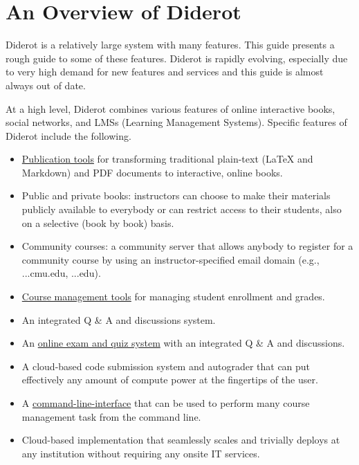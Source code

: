 \chapter{An Overview of Diderot}
\label{ch:overview}

\begin{gram}
Diderot is a relatively large system with many features. This guide presents a rough guide to some of these features.  Diderot is rapidly evolving, especially due to very high demand for new features and services and this guide is almost always out of date.

At a high level, Diderot combines various features of online interactive books,  social networks, and LMSs (Learning Management Systems).
% 
Specific features of Diderot include the following.
\end{gram}

\begin{itemize}

\item  
\href{ch:dc}{Publication tools} 
%
for transforming traditional plain-text (LaTeX and Markdown) and PDF documents to interactive, online books. 

\item 
Public and private books: instructors can choose to make their materials publicly available to everybody or can restrict access to their students, also on a selective (book by book) basis.

\item Community courses: a community server that allows anybody to register for a community course by using an instructor-specified email domain (e.g., \@...cmu.edu, \@...edu).
 
\item \href{ch:lms}{Course management tools} for managing student enrollment and grades.

\item An integrated Q \& A and discussions system. 

\item An \href{ch:quiz}{online exam and quiz system} with an integrated Q \& A and discussions.  

\item A cloud-based code submission system and autograder that can put
  effectively any amount of compute power at the fingertips of the
  user.

\item A \href{ch:cli}{command-line-interface} that can be used to perform many course management task from the command line.

\item
  Cloud-based implementation that seamlessly scales and trivially
  deploys at any institution without requiring any onsite IT services.
\end{itemize}

